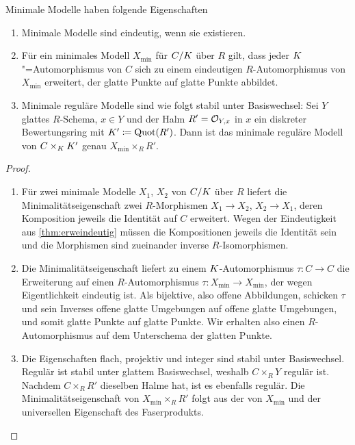 \documentclass[german]{scrreprt}
\begin{document}
\begin{Satz}\label{thm:eigminmodell}
  Minimale Modelle haben folgende Eigenschaften
  \begin{enumerate}[label=(\roman*)]
  \item Minimale Modelle sind eindeutig, wenn sie existieren.
  \item{}
    Für ein minimales Modell $X_{\text{min}}$ für $C/K$ über $R$
    gilt, dass jeder $K$"=Automorphismus von $C$ sich zu
    einem eindeutigen $R$-Automorphismus von $X_{\text{min}}$
    erweitert, der glatte Punkte auf glatte Punkte abbildet.
  \item\cite[vgl.][Beweis von Proposition IV.6.10]{silverman2}
    Minimale reguläre Modelle sind wie folgt stabil unter Basiswechsel:
    Sei $Y$ glattes $R$-Schema, $x\in Y$ und der Halm $R'=\mathcal{O}_{Y,x}$ in
    $x$  ein diskreter Bewertungsring mit $K'\coloneqq\operatorname{Quot}(R')$.
    Dann ist das minimale reguläre Modell von $C\times_{K}K'$ genau
    $X_{\text{min}}\times_R R'$.
  \end{enumerate}
  \begin{proof}
    \begin{enumerate}[label=(\roman*)]
    \item Für zwei minimale Modelle $X_1$, $X_2$ von $C/K$ über $R$
      liefert die Minimalitätseigenschaft zwei $R$-Morphismen
      $X_1\to X_2$, $X_2\to X_1$, deren Komposition jeweils die
      Identität auf $C$ erweitert. Wegen der Eindeutigkeit aus
      \ref{thm:erweindeutig} müssen die Kompositionen jeweils die
      Identität sein und die Morphismen sind zueinander inverse
      $R$-Isomorphismen.
    \item Die Minimalitätseigenschaft liefert zu einem
      $K$-Automorphismus $\tau\colon C\to C$ die Erweiterung auf
      einen $R$-Automorphismus
      $\tau\colon X_{\text{min}}\to X_{\text{min}}$, der wegen
      Eigentlichkeit eindeutig ist.
      Als bijektive, also offene Abbildungen, schicken $\tau$ und
      sein Inverses offene glatte Umgebungen auf offene glatte
      Umgebungen, und somit glatte Punkte auf glatte Punkte. Wir
      erhalten also einen $R$-Automorphismus auf dem Unterschema der
      glatten Punkte.
    \item Die Eigenschaften flach, projektiv und integer sind stabil
      unter Basiswechsel. Regulär ist stabil unter glattem
      Basiswechsel, weshalb $C\times_R Y$ regulär ist.
      Nachdem $C\times_R R'$ dieselben Halme hat, ist es ebenfalls
      regulär.
      Die Minimalitätseigenschaft von $X_{\text{min}}\times_R R'$
      folgt aus der von $X_{\text{min}}$ und der universellen
      Eigenschaft des Faserprodukts.
    \end{enumerate}
  \end{proof}
\end{Satz}
\end{document}
